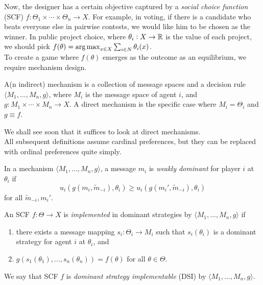 	Now, the designer has a certain objective captured by a \emph{social choice function} (SCF) $f : \Theta_1 \times \cdots \times \Theta_n \to X$. For example, in voting, if there is a candidate who beats everyone else in pairwise contests, we would like him to be chosen as the winner. In public project choice, where $\theta_i : X \to \mathbb{R}$ is the value of each project, we should pick $f(\theta) = \operatorname*{arg\,max}_{x \in X} \sum_{i \in N} \theta_i(x)$.\\
	To create a game where $f(\theta)$ emerges as the outcome as an equilibrium, we require mechanism design.

	\begin{fdef}
		A(n indirect) mechanism is a collection of message spaces and a decision rule $\langle M_1,\ldots,M_n,g\rangle$, where $M_i$ is the message space of agent $i$, and $g : M_1 \times \cdots \times M_n \to X$. A direct mechanism is the specific case where $M_i = \Theta_i$ and $g \equiv f$.
	\end{fdef}

	We shall see soon that it suffices to look at direct mechanisms.\\
	All subsequent definitions assume cardinal preferences, but they can be replaced with ordinal preferences quite simply.

	\begin{fdef}
		In a mechanism $\langle M_1,\ldots,M_n,g\rangle$, a message $m_i$ is \emph{weakly dominant} for player $i$ at $\theta_i$ if
		\begin{equation}
			\label{eqn: weakly dominant}
			u_i(g(m_i,\widetilde{m}_{-i}),\theta_i) \ge u_i(g(m_i',\widetilde{m}_{-i}),\theta_i)
		\end{equation}
		for all $\widetilde{m}_{-i},m_i'$.
	\end{fdef}

	\begin{fdef}
		 An SCF $f : \Theta \to X$ is \emph{implemented} in dominant strategies by $\langle M_1,\ldots,M_n,g\rangle$ if
		 \begin{enumerate}
		 	\item there exists a message mapping $s_i : \Theta_i \to M_i$ such that $s_i(\theta_i)$ is a dominant strategy for agent $i$ at $\theta_i$, and
		 	\item $g(s_1(\theta_1),\ldots,s_n(\theta_n)) = f(\theta)$ for all $\theta \in \Theta$.
		 \end{enumerate}
		We say that SCF $f$ is \emph{dominant strategy implementable} (DSI) by $\langle M_1,\ldots,M_n,g\rangle$.
	\end{fdef}

